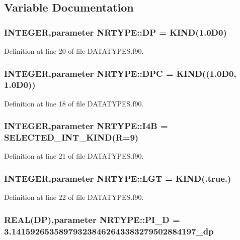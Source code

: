 \subsection{Variable Documentation}
\hypertarget{namespaceNRTYPE_ac04234d0d9fbb992bc90e09d33317d5a}{
\subsubsection[{DP}]{\setlength{\rightskip}{0pt plus 5cm}INTEGER,parameter {\bf NRTYPE::DP} = KIND(1.0D0)}}
\label{namespaceNRTYPE_ac04234d0d9fbb992bc90e09d33317d5a}


Definition at line 20 of file DATATYPES.f90.

\hypertarget{namespaceNRTYPE_aef0a8a355687c7f4bb0cfc4da1fa7dc1}{
\subsubsection[{DPC}]{\setlength{\rightskip}{0pt plus 5cm}INTEGER,parameter {\bf NRTYPE::DPC} = KIND((1.0D0, 1.0D0))}}
\label{namespaceNRTYPE_aef0a8a355687c7f4bb0cfc4da1fa7dc1}


Definition at line 18 of file DATATYPES.f90.

\hypertarget{namespaceNRTYPE_a58a56fb59c61ae4e8af28eabfe3d3b59}{
\subsubsection[{I4B}]{\setlength{\rightskip}{0pt plus 5cm}INTEGER,parameter {\bf NRTYPE::I4B} = SELECTED\_\-INT\_\-KIND(R=9)}}
\label{namespaceNRTYPE_a58a56fb59c61ae4e8af28eabfe3d3b59}


Definition at line 21 of file DATATYPES.f90.

\hypertarget{namespaceNRTYPE_ac467681e919a8be9d83a8bf1808d497c}{
\subsubsection[{LGT}]{\setlength{\rightskip}{0pt plus 5cm}INTEGER,parameter {\bf NRTYPE::LGT} = KIND(.true.)}}
\label{namespaceNRTYPE_ac467681e919a8be9d83a8bf1808d497c}


Definition at line 22 of file DATATYPES.f90.

\hypertarget{namespaceNRTYPE_a651a3a781cff22a0a0886657381949db}{
\subsubsection[{PI\_\-D}]{\setlength{\rightskip}{0pt plus 5cm}REAL({\bf DP}),parameter {\bf NRTYPE::PI\_\-D} = 3.141592653589793238462643383279502884197\_\-dp}}
\label{namespaceNRTYPE_a651a3a781cff22a0a0886657381949db}


